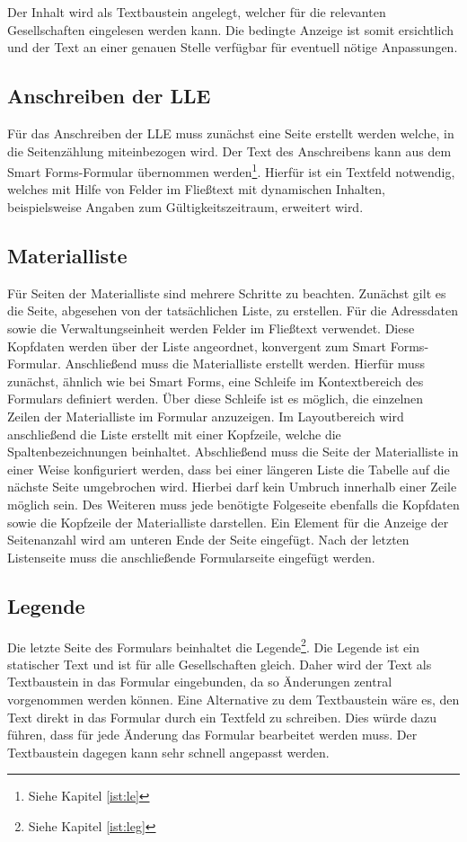 Der Inhalt wird als Textbaustein angelegt, welcher für die relevanten Gesellschaften eingelesen werden kann. Die bedingte Anzeige ist somit ersichtlich und der Text an einer genauen Stelle verfügbar für eventuell nötige Anpassungen. 

\subsection{Anschreiben der \acs{LLE}}

Für das Anschreiben der \ac{LLE} muss zunächst eine Seite erstellt werden welche, in die Seitenzählung miteinbezogen wird. Der Text des Anschreibens kann aus dem Smart Forms-Formular übernommen werden\footnote{Siehe Kapitel \ref{ist:le}}. Hierfür ist ein Textfeld notwendig, welches mit Hilfe von Felder im Fließtext mit dynamischen Inhalten, beispielsweise Angaben zum Gültigkeitszeitraum, erweitert wird. 

\subsection{Materialliste}

Für Seiten der Materialliste sind mehrere Schritte zu beachten. Zunächst gilt es die Seite, abgesehen von der tatsächlichen Liste, zu erstellen. Für die Adressdaten sowie die Verwaltungseinheit werden Felder im Fließtext verwendet. Diese Kopfdaten werden über der Liste angeordnet, konvergent zum Smart Forms-Formular. Anschließend muss die Materialliste erstellt werden. Hierfür muss zunächst, ähnlich wie bei Smart Forms, eine Schleife im Kontextbereich des Formulars definiert werden. Über diese Schleife ist es möglich, die einzelnen Zeilen der Materialliste im Formular anzuzeigen. Im Layoutbereich wird anschließend die Liste erstellt mit einer Kopfzeile, welche die Spaltenbezeichnungen beinhaltet. Abschließend muss die Seite der Materialliste in einer Weise konfiguriert werden, dass bei einer längeren Liste die Tabelle auf die nächste Seite umgebrochen wird. Hierbei darf kein Umbruch innerhalb einer Zeile möglich sein. Des Weiteren muss jede benötigte Folgeseite ebenfalls die Kopfdaten sowie die Kopfzeile der Materialliste darstellen. Ein Element für die Anzeige der Seitenanzahl wird am unteren Ende der Seite eingefügt. Nach der letzten Listenseite muss die anschließende Formularseite eingefügt werden.

\subsection{Legende}
Die letzte Seite des Formulars beinhaltet die Legende\footnote{Siehe Kapitel \ref{ist:leg}}.
Die Legende ist ein statischer Text und ist für alle Gesellschaften gleich. Daher wird der Text als Textbaustein in das Formular eingebunden, da so Änderungen zentral vorgenommen werden können. Eine Alternative zu dem Textbaustein wäre es, den Text direkt in das Formular durch ein Textfeld zu schreiben. Dies würde dazu führen, dass für jede Änderung das Formular bearbeitet werden muss. Der Textbaustein dagegen kann sehr schnell angepasst werden.



